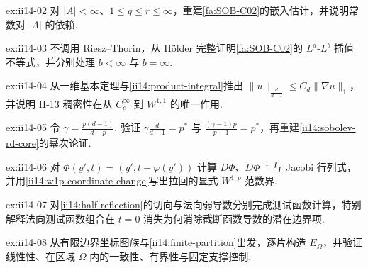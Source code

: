 \begin{FAExercise}{ex:ii14-02}
对 \(\displaystyle|A|<\infty\)、\(\displaystyle1\leqslant q\leqslant r\leqslant\infty\)，重建\autoref{fa:SOB-C02}的嵌入估计，并说明常数对 \(\displaystyle|A|\) 的依赖.
\end{FAExercise}

\begin{FAExercise}[\(\displaystyle L^p\) 插值]{ex:ii14-03}
不调用 Riesz--Thorin，从 Hölder 完整证明\autoref{fa:SOB-C02}的 \(\displaystyle L^a\)-\(\displaystyle L^b\) 插值不等式，并分别处理 \(\displaystyle b<\infty\) 与 \(\displaystyle b=\infty\).
\end{FAExercise}

\begin{FAExercise}[\(\displaystyle p=1\) 全空间核心估计]{ex:ii14-04}
从一维基本定理与\autoref{ii14:product-integral}推出 \(\displaystyle\|u\|_{\frac{d}{d-1}}\leqslant C_d\|\nabla u\|_1\)，并说明 II-13 稠密性在从 \(\displaystyle C_c^\infty\) 到 \(\displaystyle W^{1,1}\) 的唯一作用.
\end{FAExercise}

\begin{FAExercise}{ex:ii14-05}
令 \(\displaystyle\gamma=\frac{p(d-1)}{d-p}\). 验证 \(\displaystyle\gamma \frac{d}{d-1}=p^*\) 与 \(\displaystyle\frac{(\gamma-1)p}{p-1}=p^*\)，再重建\autoref{ii14:sobolev-rd-core}的幂次论证.
\end{FAExercise}

\begin{FAExercise}{ex:ii14-06}
对 \(\displaystyle\Phi(y',t)=(y',t+\varphi(y'))\) 计算 \(\displaystyle D\Phi\)、\(\displaystyle D\Phi^{-1}\) 与 Jacobi 行列式，并用\autoref{ii14:w1p-coordinate-change}写出拉回的显式 \(\displaystyle W^{1,p}\) 范数界.
\end{FAExercise}

\begin{FAExercise}[半空间反射延拓]{ex:ii14-07}
对\autoref{ii14:half-reflection}的切向与法向弱导数分别完成测试函数计算，特别解释法向测试函数组合在 \(\displaystyle t=0\) 消失为何消除截断函数导数的潜在边界项.
\end{FAExercise}

\begin{FAExercise}[单位分解延拓]{ex:ii14-08}
从有限边界坐标图族与\autoref{ii14:finite-partition}出发，逐片构造 \(\displaystyle E_\Omega\)，并验证线性性、在区域 \(\displaystyle\Omega\) 内的一致性、有界性与固定支撑控制.
\end{FAExercise}

